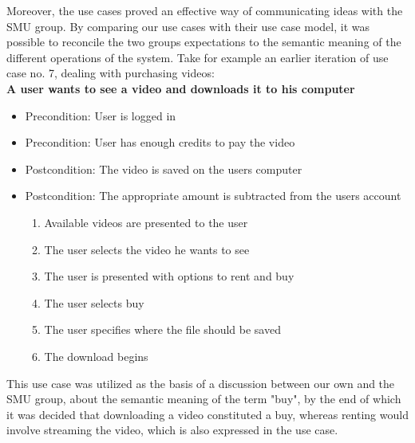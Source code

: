 Moreover, the use cases proved an effective way of communicating ideas with the SMU group. By comparing our use cases with their use case model, it was possible to reconcile the two groups expectations to the semantic meaning of the different operations of the system. Take for example an earlier iteration of use case no. 7, dealing with purchasing videos:\\

\textbf{A user wants to see a video and downloads it to his computer}
\begin{itemize}
\item Precondition: User is logged in
\item Precondition: User has enough credits to pay the video
\item Postcondition: The video is saved on the users computer
\item Postcondition: The appropriate amount is subtracted from the users account
\begin{enumerate}
\item Available videos are presented to the user
\item The user selects the video he wants to see
\item The user is presented with options to rent and buy
\item The user selects buy
\item The user specifies where the file should be saved
\item The download begins
\end{enumerate}
\end{itemize}

This use case was utilized as the basis of a discussion between our own and the SMU group, about the semantic meaning of the term "buy", by the end of which it was decided that downloading a video constituted a buy, whereas renting would involve streaming the video, which is also expressed in the use case.


